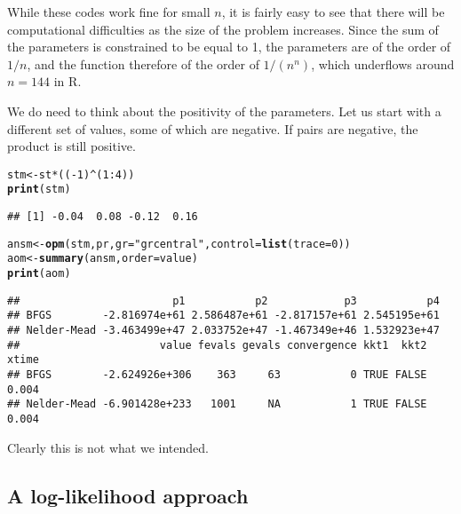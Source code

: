 \documentclass[11pt]{article}\usepackage[]{graphicx}\usepackage[]{color}
\makeatletter
\newcommand{\hlnum}[1]{\textcolor[rgb]{0.686,0.059,0.569}{#1}}%
\newcommand{\hlstr}[1]{\textcolor[rgb]{0.192,0.494,0.8}{#1}}%
\newcommand{\hlopt}[1]{\textcolor[rgb]{0,0,0}{#1}}%
\newcommand{\hlstd}[1]{\textcolor[rgb]{0.345,0.345,0.345}{#1}}%
\newcommand{\hlkwb}[1]{\textcolor[rgb]{0.69,0.353,0.396}{#1}}%
\newcommand{\hlkwc}[1]{\textcolor[rgb]{0.333,0.667,0.333}{#1}}%
\newcommand{\hlkwd}[1]{\textcolor[rgb]{0.737,0.353,0.396}{\textbf{#1}}}%
\newenvironment{kframe}{%
 \def\at@end@of@kframe{}%
 \ifinner\ifhmode%
  \def\at@end@of@kframe{\end{minipage}}%
  \begin{minipage}{\columnwidth}%
 \fi\fi%
 \def\FrameCommand##1{\hskip\@totalleftmargin \hskip-\fboxsep
 \colorbox{shadecolor}{##1}\hskip-\fboxsep
     \hskip-\linewidth \hskip-\@totalleftmargin \hskip\columnwidth}%
 \MakeFramed {\advance\hsize-\width
   \@totalleftmargin\z@ \linewidth\hsize
   \@setminipage}}%
 {\par\unskip\endMakeFramed%
 \at@end@of@kframe}
\newenvironment{knitrout}{}{} %
\newcommand{\R}{{\sf R}}
\makeatother
\begin{document}
While these codes work fine for small $n$, it is fairly easy to see that there will be 
computational difficulties as the size of the problem increases. Since the sum of the 
parameters is constrained to be equal to 1, the parameters are of the order of $1/n$,
and the function therefore of the order of $1/(n^n)$, which underflows around $n=144$ in 
\R. 

We do need to think about the positivity of the parameters. Let us start with 
a different set of values, some of which are negative. If pairs are negative, the 
product is still positive.

\begin{knitrout}\scriptsize
{}\color{fgcolor}\begin{kframe}
\begin{alltt}
\hlstd{stm} \hlkwb{<-} \hlstd{st}\hlopt{*}\hlstd{((}\hlopt{-}\hlnum{1}\hlstd{)}\hlopt{^}\hlstd{(}\hlnum{1}\hlopt{:}\hlnum{4}\hlstd{))}
\hlkwd{print}\hlstd{(stm)}
\end{alltt}
\begin{verbatim}
## [1] -0.04  0.08 -0.12  0.16
\end{verbatim}
\begin{alltt}
\hlstd{ansm}\hlkwb{<-}\hlkwd{opm}\hlstd{(stm, pr,} \hlkwc{gr}\hlstd{=}\hlstr{"grcentral"}\hlstd{,} \hlkwc{control}\hlstd{=}\hlkwd{list}\hlstd{(}\hlkwc{trace}\hlstd{=}\hlnum{0}\hlstd{))}
\hlstd{aom} \hlkwb{<-} \hlkwd{summary}\hlstd{(ansm,} \hlkwc{order}\hlstd{=value)}
\hlkwd{print}\hlstd{(aom)}
\end{alltt}
\begin{verbatim}
##                        p1           p2            p3           p4
## BFGS        -2.816974e+61 2.586487e+61 -2.817157e+61 2.545195e+61
## Nelder-Mead -3.463499e+47 2.033752e+47 -1.467349e+46 1.532923e+47
##                      value fevals gevals convergence kkt1  kkt2 xtime
## BFGS        -2.624926e+306    363     63           0 TRUE FALSE 0.004
## Nelder-Mead -6.901428e+233   1001     NA           1 TRUE FALSE 0.004
\end{verbatim}
\end{kframe}
\end{knitrout}

Clearly this is not what we intended.

\subsection{A log-likelihood approach}
\end{document}
